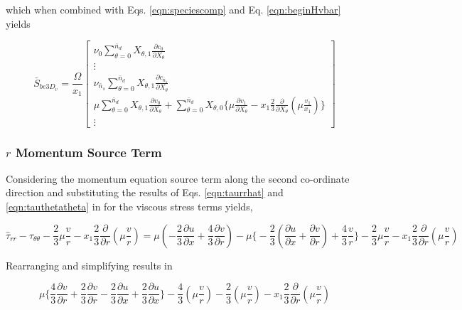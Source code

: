 	which when combined with Eqs. \ref{eqn:speciescomp} and Eq. \ref{eqn:beginHvbar} yields

\begin{displaymath}
	\bar{S}_{be3D_v} = \frac{\Omega}{x_1}\left[ \begin{array}{c}
		\nu_0 \sum_{\theta = 0}^{\bar{n}_d}X_{\theta,1} 
		\frac{\partial c_0}{\partial X_\theta} \\
		\vdots \\
		\nu_{\bar{n}_s} \sum_{\theta = 0}^{\bar{n}_d}X_{\theta,1} 
		\frac{\partial c_{\bar{n}_s}}{\partial X_\theta} \\
		\mu \sum_{\theta = 0}^{\bar{n}_d} X_{\theta,1}\frac{\partial v_0}{\partial X_\theta}
		+ \sum_{\theta = 0}^{\bar{n}_d} X_{\theta,0} \Big\{\mu \frac{\partial v_1}{\partial X_\theta} 
		- x_1 \frac{2}{3} \frac{\partial}{\partial X_\theta}(\mu \frac{v_1}{x_1}) \Big\} \\
		\vdots
		   \end{array}
	    \right]
\end{displaymath}

\subsubsection{$r$ Momentum Source Term}

	Considering the momentum equation source term along the second co-ordinate direction and 
substituting the results of Eqs. \ref{eqn:taurrhat} and \ref{eqn:tauthetatheta} in for
the viscous stress terms yields,

\begin{displaymath}
	\hat{ \tau}_{rr} -\tau_{\theta \theta} - \frac{2}{3}\mu \frac{v}{r} 
	- x_1\frac{2}{3}\frac{\partial}{\partial r}(\mu \frac{v}{r}) =  
	\mu ( - \frac{2}{3} \frac{\partial u}{\partial x} + \frac{4}{3} \frac{\partial v}{\partial r})
	- \mu \Big\{- \frac{2}{3} (\frac{\partial u}{\partial x} + \frac{\partial v}{\partial r})  
	+ \frac{4}{3} \frac{v}{r} \Big\} - \frac{2}{3}\mu \frac{v}{r} 
	- x_1\frac{2}{3}\frac{\partial}{\partial r}(\mu \frac{v}{r})
\end{displaymath}

	Rearranging and simplifying results in

\begin{displaymath}
	\mu \Big\{\frac{4}{3}\frac{\partial v}{\partial r} + \frac{2}{3}\frac{\partial v}{\partial r}
	- \frac{2}{3}\frac{\partial u}{\partial x} + \frac{2}{3}\frac{\partial u}{\partial x}  \Big\}
	-\frac{4}{3}(\mu \frac{v}{r}) - \frac{2}{3}(\mu \frac{v}{r}) - x_1\frac{2}{3}\frac{\partial}{\partial r}
	(\mu \frac{v}{r})
\end{displaymath}

